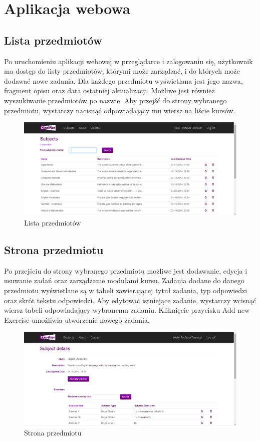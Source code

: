 \documentclass{pracamgr}
\begin{document}
\section{Aplikacja webowa}

\subsection{Lista przedmiotów}
Po uruchomieniu aplikacji webowej w przeglądarce i zalogowaniu się, użytkownik ma dostęp do listy przedmiotów, którymi może zarządzać, i do których może dodawać nowe zadania. Dla każdego przedmiotu wyświetlana jest jego nazwa, fragment opisu oraz data ostatniej aktualizacji. Możliwe jest również wyszukiwanie przedmiotów po nazwie. Aby przejść do strony wybranego przedmiotu, wystarczy nacisnąć odpowiadający mu wiersz na liście kursów.

\begin{figure}[h]
    \centering
    \includegraphics[width=1.0\textwidth]{Web_courses.png}
    \caption{Lista przedmiotów}
    \label{fig:web_courses}
\end{figure}

\subsection{Strona przedmiotu}
Po przejściu do strony wybranego przedmiotu możliwe jest dodawanie, edycja i usuwanie zadań oraz zarządzanie modułami kursu. Zadania dodane do danego przedmiotu wyświetlane są w tabeli zawierającej tytuł zadania, typ odpowiedzi oraz skrót tekstu odpowiedzi. Aby edytować istniejące zadanie, wystarczy wcisnąć wiersz tabeli odpowiadający wybranemu zadaniu. Kliknięcie przycisku Add new Exercise umożliwia utworzenie nowego zadania. 

\begin{figure}[h]
    \centering
    \includegraphics[width=1.0\textwidth]{Web_course.png}
    \caption{Strona przedmiotu}
    \label{fig:web_course}
\end{figure}
\end{document}
